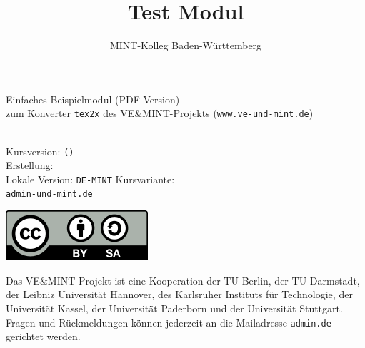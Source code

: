 



\graphicspath{{./../static/}}

\title{Test Modul}
\author{MINT-Kolleg Baden-W\"urttemberg}



\MSetSubject{\MINTMathematics}

\begin{framed}
\begin{center}
\LARGE
Einfaches Beispielmodul (PDF-Version)\\
\large
zum Konverter \texttt{tex2x} des VE\&MINT-Projekts (\texttt{www.ve-und-mint.de})
\end{center}
\ \\

Kursversion:  \texttt{\MSignatureMain (\MSignatureVersion)}\\
Erstellung:  \MSignatureDate\\
Lokale Version:  \texttt{DE-MINT}
Kursvariante: \texttt{\MSignatureVariant}\\
\scriptsize \texttt{admin\@@ve-und-mint.de}
\end{framed}


\begin{center}
\includegraphics[scale=0.45]{cclbysa.png}
\end{center}


Das VE\&MINT-Projekt ist eine Kooperation der TU Berlin, der TU Darmstadt, der Leibniz Universität Hannover, des Karlsruher
Instituts für Technologie, der Universität Kassel, der Universität Paderborn und der Universität Stuttgart.
Fragen und Rückmeldungen können jederzeit an die Mailadresse \texttt{admin\@@veundmint.de} gerichtet werden.

\Mtableofcontents


\MPrintIndex



